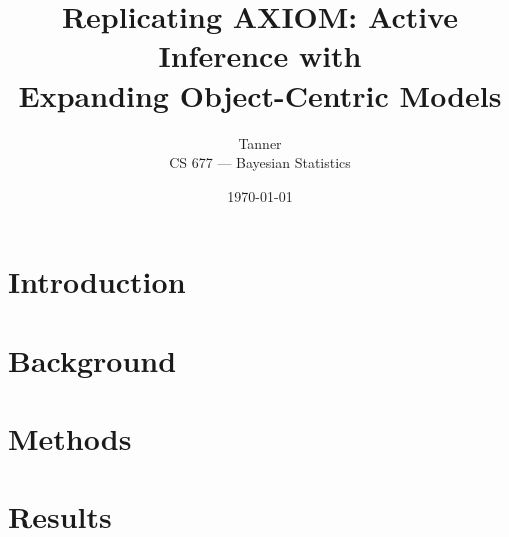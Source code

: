 \documentclass[12pt]{article}
\title{Replicating AXIOM: Active Inference with\\Expanding Object-Centric Models}
\author{Tanner \\ CS 677 — Bayesian Statistics}
\date{\today}
\begin{document}
\maketitle

\section{Introduction}



\section{Background}



\section{Methods}



\section{Results}
\end{document}
